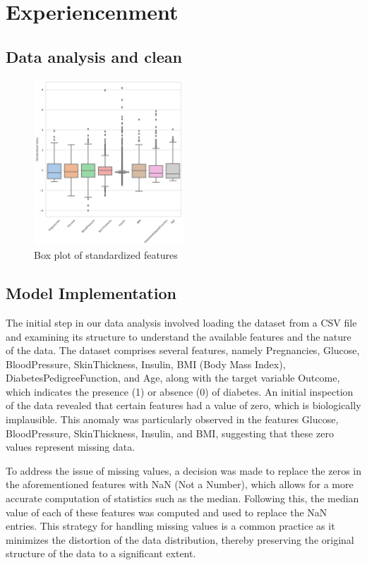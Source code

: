 \documentclass[10pt,twocolumn,letterpaper]{article}
\begin{document}
\section{Experiencenment}

\subsection{Data analysis and clean}

\begin{figure}[htbp]
   \centering
   \includegraphics[width=0.5\textwidth]{Fig/1.png}
   \caption{Box plot of standardized features} \label{fig1}
\end{figure}

\subsection{Model Implementation}

The initial step in our data analysis involved loading the dataset from a CSV file and examining its structure to understand the available features and the nature of the data. The dataset comprises several features, namely Pregnancies, Glucose, BloodPressure, SkinThickness, Insulin, BMI (Body Mass Index), DiabetesPedigreeFunction, and Age, along with the target variable Outcome, which indicates the presence (1) or absence (0) of diabetes. An initial inspection of the data revealed that certain features had a value of zero, which is biologically implausible. This anomaly was particularly observed in the features Glucose, BloodPressure, SkinThickness, Insulin, and BMI, suggesting that these zero values represent missing data.

To address the issue of missing values, a decision was made to replace the zeros in the aforementioned features with NaN (Not a Number), which allows for a more accurate computation of statistics such as the median. Following this, the median value of each of these features was computed and used to replace the NaN entries. This strategy for handling missing values is a common practice as it minimizes the distortion of the data distribution, thereby preserving the original structure of the data to a significant extent.
\end{document}
